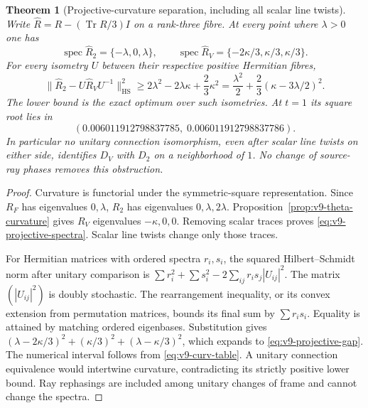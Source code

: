 \documentclass[11pt]{article}
\newtheorem{theorem}{Theorem}[section]
\theoremstyle{definition}
\theoremstyle{remark}
\newcommand{\Tr}{\operatorname{Tr}}
\newcommand{\spec}{\operatorname{spec}}
\newcommand{\HS}{\mathrm{HS}}
\begin{document}
\begin{theorem}[Projective-curvature separation, including all scalar line twists]
\label{thm:v9-projective-gap}
Write $\widehat R=R-(\Tr R/3)I$ on a rank-three fibre. At every point
where $\lambda>0$ one has
\begin{equation}
 \spec\widehat R_2=\{-\lambda,0,\lambda\},\qquad
 \spec\widehat R_V=\{-2\kappa/3,\kappa/3,\kappa/3\}.
 \label{eq:v9-projective-spectra}
\end{equation}
For every isometry $U$ between their respective positive Hermitian fibres,
\begin{equation}
 \boxed{
 \|\widehat R_2-U\widehat R_VU^{-1}\|_{\HS}^2
 \ge 2\lambda^2-2\lambda\kappa+\frac23\kappa^2
 =\frac{\lambda^2}{2}+\frac23(\kappa-3\lambda/2)^2.}
 \label{eq:v9-projective-gap}
\end{equation}
The lower bound is the exact optimum over such isometries. At $t=1$ its
square root lies in
\begin{equation}
 \boxed{(0.006011912798837785,\;0.006011912798837786).}
 \label{eq:v9-projective-gap-numeric}
\end{equation}
In particular no unitary connection isomorphism, even after scalar line
twists on either side, identifies $D_V$ with $D_2$ on a neighborhood of
$1$. No change of source-ray phases removes this obstruction.
\end{theorem}
\begin{proof}
Curvature is functorial under the symmetric-square representation. Since
$R_F$ has eigenvalues $0,\lambda$, $R_2$ has eigenvalues
$0,\lambda,2\lambda$. Proposition~\ref{prop:v9-theta-curvature} gives
$R_V$ eigenvalues $-\kappa,0,0$. Removing scalar traces proves
\cref{eq:v9-projective-spectra}. Scalar line twists change only those traces.

For Hermitian matrices with ordered spectra $r_i,s_i$, the squared
Hilbert--Schmidt norm after unitary comparison is
$\sum r_i^2+\sum s_i^2-2\sum_{ij}r_i s_j|U_{ij}|^2$.
The matrix $(|U_{ij}|^2)$ is doubly stochastic. The rearrangement inequality,
or its convex extension from permutation matrices, bounds its final sum
by $\sum r_i s_i$. Equality is attained by matching ordered eigenbases.
Substitution gives
$(\lambda-2\kappa/3)^2+(\kappa/3)^2+(\lambda-\kappa/3)^2$, which
expands to \cref{eq:v9-projective-gap}. The numerical interval follows
from \cref{eq:v9-curv-table}. A unitary connection equivalence would
intertwine curvature, contradicting its strictly positive lower bound.
Ray rephasings are included among unitary changes of frame and cannot
change the spectra.
\end{proof}
\end{document}
